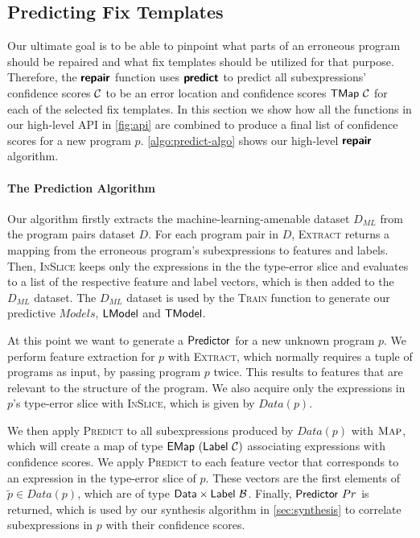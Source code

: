 

\subsection{Predicting Fix Templates}
\label{sec:templ-pred:predict}

Our ultimate goal is to be able to pinpoint what parts of an erroneous program
should be repaired and what fix templates should be utilized for that purpose.
Therefore, the $\bm{\mathsf{repair}}$ function uses $\bm{\mathsf{predict}}$ to predict all
subexpressions' confidence scores $\mathcal{C}$ to be an error location and confidence
scores $\mathsf{TMap}\ \mathcal{C}$ for each of the selected fix templates. In this section we
show how all the functions in our high-level API in \autoref{fig:api} are
combined to produce a final list of confidence scores for a new program $p$.
\autoref{algo:predict-algo} shows our high-level $\bm{\mathsf{repair}}$ algorithm.



\paragraph{The Prediction Algorithm}
Our algorithm firstly extracts the machine-learning-amenable dataset $D_{ML}$
from the program pairs dataset $D$. For each program pair in $D$,
\textsc{Extract} returns a mapping from the erroneous program's subexpressions
to features and labels. Then, \textsc{InSlice} keeps only the expressions in
the the type-error slice and evaluates to a list of the respective feature and
label vectors, which is then added to the $D_{ML}$ dataset. The $D_{ML}$ dataset
is used by the \textsc{Train} function to generate our predictive $Models$, \ie
$\mathsf{LModel}$ and $\mathsf{TModel}$.

At this point we want to generate a $\mathsf{Predictor}$ for a new unknown program
$p$. We perform feature extraction for $p$ with \textsc{Extract}, which normally
requires a tuple of programs as input, by passing program $p$ twice. This
results to features that are relevant to the structure of the program. We also
acquire only the expressions in $p$'s type-error slice with \textsc{InSlice},
which is given by $Data(p)$.

We then apply \textsc{Predict} to all subexpressions produced by $Data(p)$ with
$\textsc{Map}$, which will create a map of type $\mathsf{EMap}\ (\mathsf{Label}\ \mathcal{C})$
associating expressions with confidence scores. We apply \textsc{Predict} to
each feature vector that corresponds to an expression in the type-error slice of
$p$. These vectors are the first elements of $\tilde{p} \in Data(p)$, which are
of type $\mathsf{Data} \times \mathsf{Label}\ \mathcal{B}$. Finally, $\mathsf{Predictor}\ Pr$ is
returned, which is used by our synthesis algorithm in \autoref{sec:synthesis} to
correlate subexpressions in $p$ with their confidence scores.
